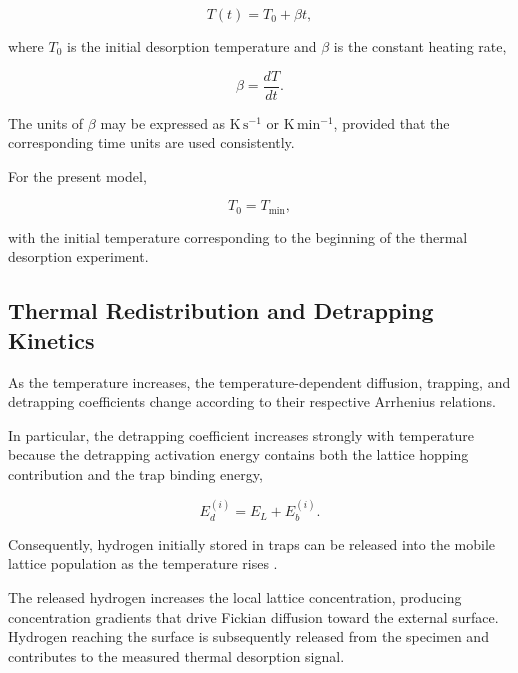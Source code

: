 \begin{equation}
T(t)
=
T_0+\beta t,
\label{eq:ch3_heating_schedule}
\end{equation}

where $T_0$ is the initial desorption temperature and $\beta$ is the
constant heating rate,

\begin{equation}
\beta
=
\frac{dT}{dt}.
\label{eq:ch3_beta}
\end{equation}

The units of $\beta$ may be expressed as
$\mathrm{K\,s^{-1}}$ or $\mathrm{K\,min^{-1}}$, provided that the
corresponding time units are used consistently.

For the present model,

\begin{equation}
T_0=T_{\min},
\label{eq:ch3_Tmin}
\end{equation}

with the initial temperature corresponding to the beginning of the
thermal desorption experiment.

\subsection{Thermal Redistribution and Detrapping Kinetics}
\label{subsec:thermal_redistribution}

As the temperature increases, the temperature-dependent diffusion,
trapping, and detrapping coefficients change according to their
respective Arrhenius relations.

In particular, the detrapping coefficient increases strongly with
temperature because the detrapping activation energy contains both the
lattice hopping contribution and the trap binding energy,

\begin{equation}
E_d^{(i)}
=
E_L+E_b^{(i)}.
\end{equation}

Consequently, hydrogen initially stored in traps can be released into
the mobile lattice population as the temperature rises
\cite{Turnbull1997,Legrand2015,Marrani2025}.

The released hydrogen increases the local lattice concentration,
producing concentration gradients that drive Fickian diffusion toward
the external surface. Hydrogen reaching the surface is subsequently
released from the specimen and contributes to the measured thermal
desorption signal.

